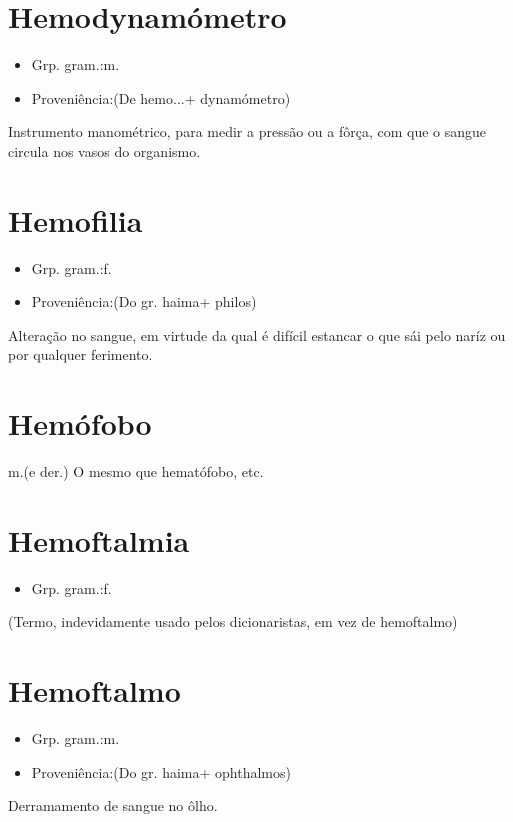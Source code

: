 \documentclass{article}
\begin{document}
\section{Hemodynamómetro}
\begin{itemize}
\item {Grp. gram.:m.}
\end{itemize}
\begin{itemize}
\item {Proveniência:(De \textunderscore hemo...\textunderscore  + \textunderscore dynamómetro\textunderscore )}
\end{itemize}
Instrumento manométrico, para medir a pressão ou a fôrça, com que o sangue circula nos vasos do organismo.
\section{Hemofilia}
\begin{itemize}
\item {Grp. gram.:f.}
\end{itemize}
\begin{itemize}
\item {Proveniência:(Do gr. \textunderscore haima\textunderscore  + \textunderscore philos\textunderscore )}
\end{itemize}
Alteração no sangue, em virtude da qual é difícil estancar o que sái pelo naríz ou por qualquer ferimento.
\section{Hemófobo}
\textunderscore m.\textunderscore  (e der.)
O mesmo que \textunderscore hematófobo\textunderscore , etc.
\section{Hemoftalmia}
\begin{itemize}
\item {Grp. gram.:f.}
\end{itemize}
(Termo, indevidamente usado pelos dicionaristas, em vez de \textunderscore hemoftalmo\textunderscore )
\section{Hemoftalmo}
\begin{itemize}
\item {Grp. gram.:m.}
\end{itemize}
\begin{itemize}
\item {Proveniência:(Do gr. \textunderscore haima\textunderscore  + \textunderscore ophthalmos\textunderscore )}
\end{itemize}
Derramamento de sangue no ôlho.
\end{document}
